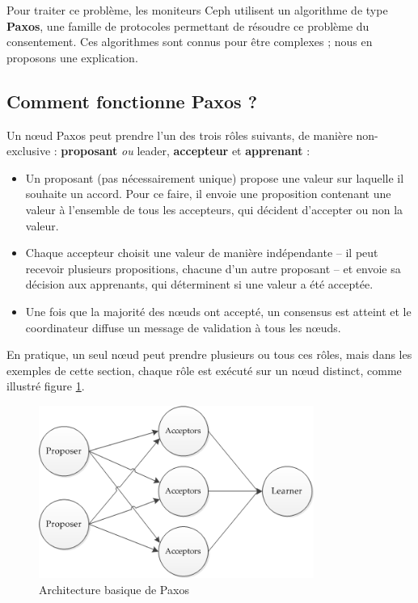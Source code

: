 Pour traiter ce problème, les moniteurs Ceph utilisent un algorithme de type \textbf{Paxos}, une famille de protocoles permettant de résoudre ce problème du consentement. Ces algorithmes sont connus pour être complexes ; nous en proposons une explication.

\subsection{Comment fonctionne Paxos ?}

Un nœud Paxos peut prendre l'un des trois rôles suivants, de manière non-exclusive : \textbf{proposant} \textit{ou} leader, \textbf{accepteur} et \textbf{apprenant} :

\begin{itemize}
\item Un proposant (pas nécessairement unique) propose une valeur sur laquelle il souhaite un accord. Pour ce faire, il envoie une proposition contenant une valeur à l'ensemble de tous les accepteurs, qui décident d'accepter ou non la valeur.
\item Chaque accepteur choisit une valeur de manière indépendante -- il peut recevoir plusieurs propositions, chacune d'un autre proposant -- et envoie sa décision aux apprenants, qui déterminent si une valeur a été acceptée.
\item Une fois que la majorité des nœuds ont accepté, un consensus est atteint et le coordinateur diffuse un message de validation à tous les nœuds.
\end{itemize}

En pratique, un seul nœud peut prendre plusieurs ou tous ces rôles, mais dans les exemples de cette section, chaque rôle est exécuté sur un nœud distinct, comme illustré figure \ref{chap2:paxos_arch}.

\begin{figure}[H]
    \centering
    \includegraphics[width=9cm]{./images/paxos_basic_archi.png}
    \caption{\label{chap2:paxos_arch}Architecture basique de Paxos}
\end{figure}


